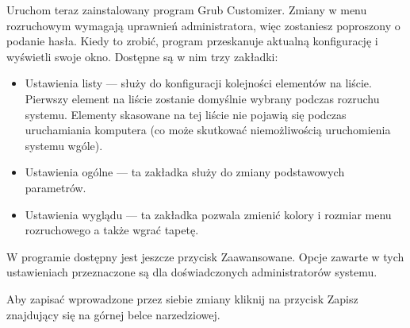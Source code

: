 Uruchom teraz zainstalowany program Grub Customizer. Zmiany w menu rozruchowym wymagają uprawnień administratora, więc zostaniesz poproszony o podanie hasła. Kiedy to zrobić, program przeskanuje aktualną konfigurację i wyświetli swoje okno. Dostępne są w nim trzy zakładki:
\begin{itemize}
\item \textcolor{ubuntu_orange}{Ustawienia listy} --- służy do konfiguracji kolejności elementów na liście. Pierwszy element na liście zostanie domyślnie wybrany podczas rozruchu systemu. Elementy skasowane na tej liście nie pojawią się podczas uruchamiania komputera (co może skutkować niemożliwością uruchomienia systemu wgóle).
\item \textcolor{ubuntu_orange}{Ustawienia ogólne} --- ta zakładka służy do zmiany podstawowych parametrów.
\item \textcolor{ubuntu_orange}{Ustawienia wyglądu} --- ta zakładka pozwala zmienić kolory i rozmiar menu rozruchowego a także wgrać tapetę.
\end{itemize}

W programie dostępny jest jeszcze przycisk \textcolor{ubuntu_orange}{Zaawansowane}. Opcje zawarte w tych ustawieniach przeznaczone są dla doświadczonych administratorów systemu.

Aby zapisać wprowadzone przez siebie zmiany kliknij na przycisk \textcolor{ubuntu_orange}{Zapisz} znajdujący się na górnej belce narzedziowej.